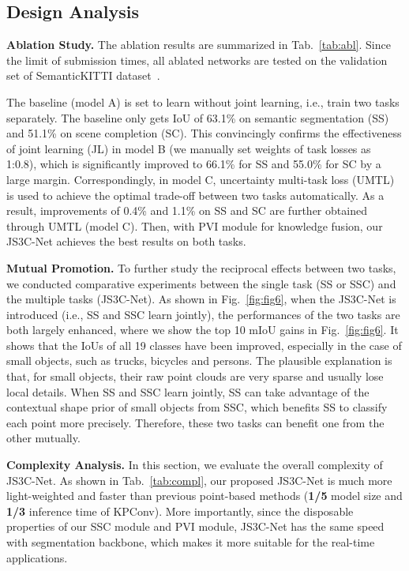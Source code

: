 \documentclass[letterpaper]{article} \usepackage{aaai21}  \usepackage{times}  \usepackage{helvet} \usepackage{courier}  \usepackage[hyphens]{url}  \usepackage{graphicx} \urlstyle{rm} \def\UrlFont{\rm}  \usepackage{natbib}  \usepackage{booktabs}
\begin{document}
	\subsection{Design Analysis}

	\noindent \textbf{Ablation Study.}
    The ablation results are summarized in Tab.~\ref{tab:abl}. Since the limit of submission times, all ablated networks are tested on the validation set of SemanticKITTI dataset~\cite{behley2019semantickitti}. 
	
	The baseline (model A) is set to learn without joint learning, i.e., train two tasks separately. 
The baseline only gets IoU of 63.1\% on semantic segmentation (SS) and 51.1\% on scene completion (SC). 
This convincingly confirms the effectiveness of joint learning (JL) in model B (we manually set weights of task losses as 1:0.8), which is significantly improved to 66.1\% for SS and 55.0\% for SC by a large margin. 
Correspondingly, in model C, uncertainty multi-task loss (UMTL) is used to achieve the optimal trade-off between two tasks automatically.
As a result, improvements of 0.4\% and 1.1\% on SS and SC are further obtained through UMTL (model C). 
Then, with PVI module for knowledge fusion, our JS3C-Net achieves the best results on both tasks.



	\noindent \textbf{Mutual Promotion.}
	To further study the reciprocal effects between two tasks, we conducted comparative experiments between the single task (SS or SSC) and the multiple tasks (JS3C-Net). 
As shown in Fig.~\ref{fig:fig6}, when the JS3C-Net is introduced (i.e., SS and SSC learn jointly), the performances of the two tasks are both largely enhanced, where we show the top 10 mIoU gains in Fig.~\ref{fig:fig6}. 
It shows that the IoUs of all 19 classes have been improved, especially in the case of small objects, such as trucks, bicycles and persons. 
The plausible explanation is that, for small objects, their raw point clouds are very sparse and usually lose local details. 
When SS and SSC learn jointly, SS can take advantage of the contextual shape prior of small objects from SSC, which benefits SS to classify each point more precisely. Therefore, these two tasks can benefit one from the other mutually.
	

	\noindent \textbf{Complexity Analysis.}
In this section, we evaluate the overall complexity of JS3C-Net.
As shown in Tab.~\ref{tab:compl}, our proposed JS3C-Net is much more light-weighted and faster than previous point-based methods (\textbf{1/5} model size and \textbf{1/3} inference time of KPConv).
More importantly, since the disposable properties of our SSC module and PVI module, JS3C-Net has the same speed with segmentation backbone, which makes it more suitable for the real-time applications.
	
\end{document}
